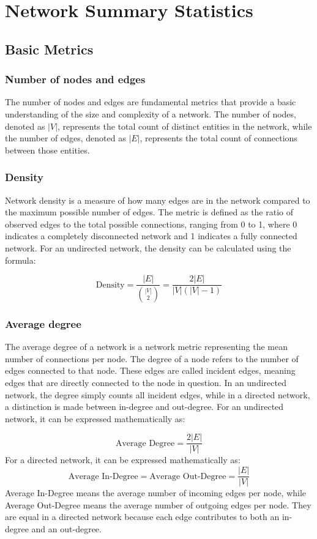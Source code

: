 \section{Network Summary Statistics}
\subsection{Basic Metrics}
\subsubsection{Number of nodes and edges}
The number of nodes and edges are fundamental metrics that provide
a basic understanding of the size and complexity of a network.
The number of nodes, denoted as $|V|$, represents the total count of distinct entities in the network,
while the number of edges, denoted as $|E|$, represents the total count of connections between those entities.

\subsubsection{Density}
Network density is a measure of how many edges are in the network compared to the maximum possible number of edges.
The metric is defined as the ratio of observed edges to the total possible connections,
ranging from 0 to 1, where 0 indicates a completely disconnected network and 1 indicates a fully connected network.
For an undirected network, the density can be calculated using the formula:

\[\text{Density} = \frac{|E|}{\binom{|V|}{2}} = \frac{2|E|}{|V|(|V|-1)}\]

\subsubsection{Average degree}
The average degree of a network is a network metric representing the mean number of connections per node.
The degree of a node refers to the number of edges connected to that node. These edges
are called incident edges, meaning edges that are directly connected to the node in question.
In an undirected network, the degree simply counts all incident edges, 
while in a directed network, a distinction is made between in-degree and out-degree.
For an undirected network, it can be expressed mathematically as:

\[\text{Average Degree} = \frac{2|E|}{|V|}\]
For a directed network, it can be expressed mathematically as:
\[\text{Average In-Degree} = \text{Average Out-Degree} = \frac{|E|}{|V|}\]
Average In-Degree means the average number of incoming edges per node,
while Average Out-Degree means the average number of outgoing edges per node.
They are equal in a directed network because each edge contributes to both an in-degree and an out-degree.

